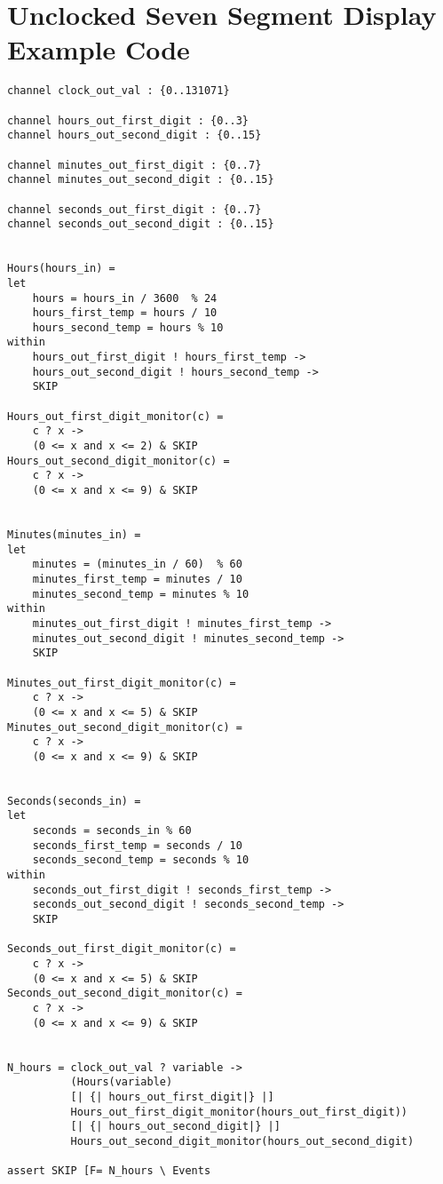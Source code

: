 \section*{Unclocked Seven Segment Display Example \cspm{} Code}
\begin{verbatim}
channel clock_out_val : {0..131071}

channel hours_out_first_digit : {0..3}
channel hours_out_second_digit : {0..15}

channel minutes_out_first_digit : {0..7}
channel minutes_out_second_digit : {0..15}

channel seconds_out_first_digit : {0..7}
channel seconds_out_second_digit : {0..15}


Hours(hours_in) =
let
    hours = hours_in / 3600  % 24
    hours_first_temp = hours / 10
    hours_second_temp = hours % 10
within
    hours_out_first_digit ! hours_first_temp ->
    hours_out_second_digit ! hours_second_temp ->
    SKIP

Hours_out_first_digit_monitor(c) =
    c ? x ->
    (0 <= x and x <= 2) & SKIP
Hours_out_second_digit_monitor(c) =
    c ? x ->
    (0 <= x and x <= 9) & SKIP


Minutes(minutes_in) =
let
    minutes = (minutes_in / 60)  % 60
    minutes_first_temp = minutes / 10
    minutes_second_temp = minutes % 10
within
    minutes_out_first_digit ! minutes_first_temp ->
    minutes_out_second_digit ! minutes_second_temp ->
    SKIP

Minutes_out_first_digit_monitor(c) =
    c ? x ->
    (0 <= x and x <= 5) & SKIP
Minutes_out_second_digit_monitor(c) =
    c ? x ->
    (0 <= x and x <= 9) & SKIP


Seconds(seconds_in) =
let
    seconds = seconds_in % 60
    seconds_first_temp = seconds / 10
    seconds_second_temp = seconds % 10
within
    seconds_out_first_digit ! seconds_first_temp ->
    seconds_out_second_digit ! seconds_second_temp ->
    SKIP

Seconds_out_first_digit_monitor(c) =
    c ? x ->
    (0 <= x and x <= 5) & SKIP
Seconds_out_second_digit_monitor(c) =
    c ? x ->
    (0 <= x and x <= 9) & SKIP


N_hours = clock_out_val ? variable ->
          (Hours(variable)
          [| {| hours_out_first_digit|} |]
          Hours_out_first_digit_monitor(hours_out_first_digit))
          [| {| hours_out_second_digit|} |]
          Hours_out_second_digit_monitor(hours_out_second_digit)

assert SKIP [F= N_hours \ Events



\end{verbatim}
